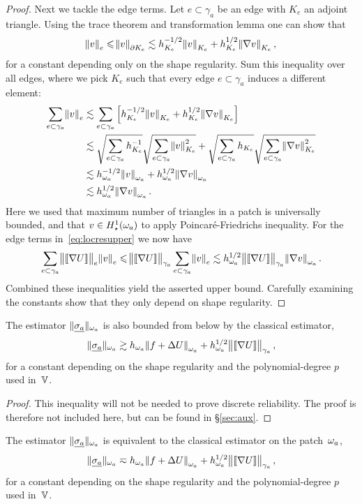 \documentclass[thesis.tex]{subfiles}
\begin{document}
\begin{proof}
  Next we tackle the edge terms. Let $e \subset \gamma_a$ be an edge with $K_e$ an adjoint triangle.
  Using the trace theorem and transformation lemma \cite[Lem~1.2]{stevenson} one can show that
  \[ 
    \norm{v}_e \leqslant \norm{v}_{\partial K_e} \lesssim h_{K_e}^{-1/2} \norm{v}_{K_e} + h_{K_e}^{1/2} \norm{\nabla v}_{K_e},
  \]
  for a constant depending only on the shape regularity. 
  Sum this inequality over all edges, where we pick  $K_e$ such that every edge $e \subset \gamma_a$ induces
  a different element: 
  \begin{align*}
    \sum_{e \subset \gamma_a} \norm{v}_e&\lesssim\sum_{e\subset \gamma_a} \left[ h_{K_e}^{-1/2} \norm{v}_{K_e} +  h_{K_e}^{1/2} \norm{\nabla v}_{K_e} \right]\\
    &\lesssim \sqrt{\sum_{e \subset \gamma_a} h_{K_e}^{-1}} \sqrt{\sum_{e\subset \gamma_a} \norm{v}_{K_e}^2} 
    + \sqrt{\sum_{e \subset \gamma_a} h_{K_e}} \sqrt{\sum_{e \subset \gamma_a} \norm{\nabla v}_{K_e}^2}\\
    &\lesssim h_{\omega_a}^{-1/2} \norm{v}_{\omega_a} + h_{\omega_a}^{1/2} \norm{\nabla v}_{\omega_a} \\
    &\lesssim h_{\omega_a}^{1/2} \norm{\nabla v}_{\omega_a}.
  \end{align*}
  Here we used that maximum number of triangles in a patch is universally bounded, and that $v \in H_\star^1(\omega_a)$ to apply 
  Poincar\'e-Friedrichs inequality. For the edge terms in~\eqref{eq:locresupper} we now have
  \[
    \sum_{e \subset \gamma_a} \norm{ \llbracket \nabla U \rrbracket}_e \norm{v}_e \leqslant \norm{\llbracket \nabla U \rrbracket}_{\gamma_a} \sum_{e \subset \gamma_a} \norm{v}_e \lesssim h_{\omega_a}^{1/2} \norm{\llbracket \nabla U \rrbracket}_{\gamma_a}  \norm{\nabla v}_{\omega_a}. 
  \]
  Combined these inequalities yield the asserted upper bound. Carefully examining the constants show that
  they only depend on shape regularity.
  \end{proof}
  \begin{lem}
    \label{lem:clasequivlow}
  The estimator $\| \underline{\sigma_a} \|_{\omega_a}$ is also bounded from below by the classical estimator,
  \[
    \| \underline{\sigma_a} \|_{\omega_a} \gtrsim h_{\omega_a}\norm{f + \Delta U}_{\omega_a} + h^{1/2}_{\omega_a} \norm{\llbracket \nabla U  \rrbracket}_{\gamma_a},
  \]
  for a constant depending on the shape regularity and the polynomial-degree $p$ used in~$\mathbb{V}$.
  \end{lem}
  \begin{proof}
    This inequality will not be needed to prove discrete reliability.
    The proof is therefore not included here, but can be found in \S\ref{sec:aux}.
  \end{proof}
\begin{cor}
  \label{lem:starequiv}
  The estimator $\| \underline{\sigma_a} \|_{\omega_a}$ is equivalent to the classical estimator on the patch~$\omega_a$, 
  \[
    \| \underline{\sigma_a} \|_{\omega_a} \eqsim h_{\omega_a}\norm{f + \Delta U}_{\omega_a} + h^{1/2}_{\omega_a} \norm{\llbracket \nabla U  \rrbracket}_{\gamma_a},
  \]
  for a constant depending on the shape regularity and the polynomial-degree $p$ used in~$\mathbb{V}$.
\end{cor}
\end{document}
